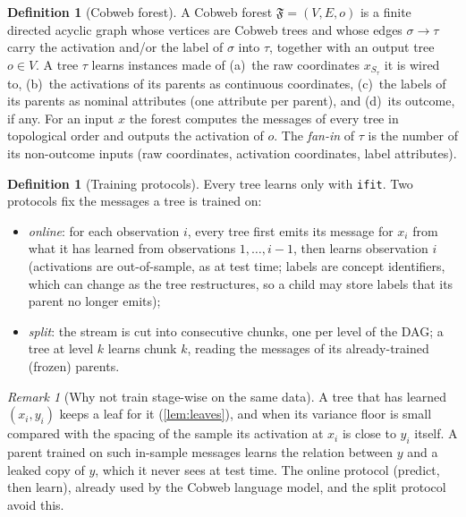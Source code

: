 \documentclass[11pt]{article}
\theoremstyle{definition}
\newtheorem{definition}[theorem]{Definition}
\theoremstyle{remark}
\newtheorem{remark}[theorem]{Remark}
\newcommand{\F}{\mathfrak{F}}
\begin{document}
\begin{definition}[Cobweb forest]\label{def:forest}
A Cobweb forest $\F=(V,E,o)$ is a finite directed acyclic graph whose vertices are
Cobweb trees and whose edges $\sigma\to\tau$ carry the activation and/or the label of
$\sigma$ into $\tau$, together with an output tree $o\in V$.  A tree $\tau$ learns
instances made of (a)~the raw coordinates $x_{S_\tau}$ it is wired to, (b)~the activations
of its parents as continuous coordinates, (c)~the labels of its parents as nominal
attributes (one attribute per parent), and (d)~its outcome, if any.  For an input $x$
the forest computes the messages of every tree in topological order and outputs the
activation of $o$.  The \emph{fan-in} of $\tau$ is the number of its non-outcome inputs
(raw coordinates, activation coordinates, label attributes).
\end{definition}

\begin{definition}[Training protocols]\label{def:forestlearn}
Every tree learns only with \texttt{ifit}.  Two protocols fix the messages a tree is
trained on:
\begin{itemize}[leftmargin=*]
\item \emph{online}: for each observation $i$, every tree first emits its message for
  $x_i$ from what it has learned from observations $1,\dots,i-1$, then learns
    observation $i$ (activations are out-of-sample, as at test time; labels are concept
  identifiers, which can change as the tree restructures, so a child may store labels
  that its parent no longer emits);
\item \emph{split}: the stream is cut into consecutive chunks, one per level of the DAG;
  a tree at level $k$ learns chunk $k$, reading the messages of its already-trained
  (frozen) parents.
\end{itemize}
\end{definition}

\begin{remark}[Why not train stage-wise on the same data]
A tree that has learned $(x_i,y_i)$ keeps a leaf for it (\cref{lem:leaves}), and when
its variance floor is small compared with the spacing of the sample its activation at
$x_i$ is close to $y_i$ itself.  A parent trained on such in-sample
messages learns the relation between $y$ and a leaked copy of $y$, which it never sees at
test time.  The online protocol (predict, then learn), already used by the Cobweb
language model, and the split protocol avoid this.
\end{remark}
\end{document}
